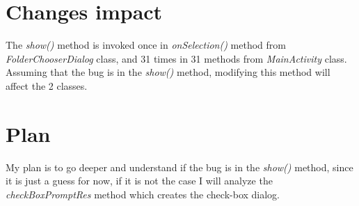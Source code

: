 \documentclass[12pt]{report}
\begin{document}
\section*{Changes impact}

The \emph{show()} method is invoked once in \emph{onSelection()} method from \emph{FolderChooserDialog} class, and 31 times in 31 methods from \emph{MainActivity} class. Assuming that the bug is in the \emph{show()} method, modifying this method will affect the 2 classes.

\section*{Plan}
My plan is to go deeper and understand if the bug is in the \emph{show()} method, since it is just a guess for now, if it is not the case I will analyze the \emph{checkBoxPromptRes} method which creates the check-box dialog.
\end{document}
